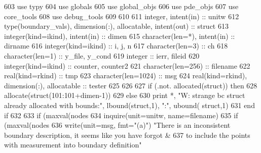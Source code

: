 \begin{DoxyCode}
603       \textcolor{keywordtype}{use }typy
604       \textcolor{keywordtype}{use }globals
605       \textcolor{keywordtype}{use }global_objs
606       \textcolor{keywordtype}{use }pde_objs
607       \textcolor{keywordtype}{use }core_tools
608       \textcolor{keywordtype}{use }debug_tools
609 
610 
611       \textcolor{keywordtype}{integer}, \textcolor{keywordtype}{intent(in)} :: unitw
612       \textcolor{keywordtype}{type}(boundary_vals), \textcolor{keywordtype}{dimension(:)}, \textcolor{keywordtype}{allocatable}, \textcolor{keywordtype}{intent(out)} :: struct
613       \textcolor{keywordtype}{integer(kind=ikind)}, \textcolor{keywordtype}{intent(in)} :: dimen
615       \textcolor{keywordtype}{character(len=*)}, \textcolor{keywordtype}{intent(in)} :: dirname
616       \textcolor{keywordtype}{integer(kind=ikind)} :: i, j, n
617       \textcolor{keywordtype}{character(len=3)} :: ch
618       \textcolor{keywordtype}{character(len=1)} :: y\_file, y\_cond
619       \textcolor{keywordtype}{integer} :: ierr, fileid
620       \textcolor{keywordtype}{integer(kind=ikind)} :: counter, counter2
621       \textcolor{keywordtype}{character(len=256)} :: filename
622       \textcolor{keywordtype}{real(kind=rkind)} :: tmp
623       \textcolor{keywordtype}{character(len=1024)} :: msg
624       \textcolor{keywordtype}{real(kind=rkind)}, \textcolor{keywordtype}{dimension(:)}, \textcolor{keywordtype}{allocatable} :: tester
625       
626       
627       \textcolor{keywordflow}{if} (.not. \textcolor{keyword}{allocated}(struct)) \textcolor{keywordflow}{then}
628         \textcolor{keyword}{allocate}(struct(101:101+dimen-1))
629       \textcolor{keywordflow}{else}
630         print *, \textcolor{stringliteral}{"W: strange bc struct already allocated with bounds:"}, lbound(struct\textcolor{comment}{,1), }\textcolor{stringliteral}{":"}\textcolor{comment}{, ubound(
      struct,1)}
631 \textcolor{comment}{}\textcolor{keywordflow}{      end if}
632       
633       \textcolor{keywordflow}{if} (maxval(nodes%
634         \textcolor{keyword}{inquire}(unit=unitw, name=filename)
635         \textcolor{keywordflow}{if} (maxval(nodes%
636           \textcolor{keyword}{write}(unit=msg, fmt=\textcolor{stringliteral}{"(a)"}) \textcolor{stringliteral}{"There is an inconsistent boundary description, it seems like you have
       forgot & }
637 \textcolor{stringliteral}{}\textcolor{stringliteral}{               to include the points with measurement into boundary definition"}

\end{DoxyCode}
